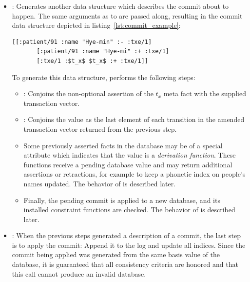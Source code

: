\begin{itemize}
  \item {}: Generates another data structure which describes the commit about to happen. The same arguments as to  are passed along, resulting in the commit data structure depicted in listing~\ref{lst:commit_example}:

  \begin{lstlisting}[label={lst:commit_example},morekeywords={:txe/1},caption=A commit of one retraction and two assertions]
      [[:patient/91 :name "Hye-min" :- :txe/1]
       [:patient/91 :name "Hye-mi" :+ :txe/1]
       [:txe/1 :$t_x$ $t_x$ :+ :txe/1]]
  \end{lstlisting}

  To generate this data structure,  performs the following steps:
  \begin{itemize}
    \item {}: Conjoins the non-optional assertion of the $t_x$ meta fact with the supplied transaction vector.

    \item {}: Conjoins the  value as the last element of each transition in the amended transaction vector returned from the previous step.

    \item {} Some previously asserted facts in the database may be of a special attribute which indicates that the value is a \emph{derivation function}. These functions receive a pending database value and may return additional assertions or retractions, for example to keep a phonetic index on people's names updated. The behavior of  is described later.

    \item {} Finally, the pending commit is applied to a new database, and its installed constraint functions are checked. The behavior of  is described later.
  \end{itemize}

  \item {}: When the previous steps generated a description of a commit, the last step is to apply the commit: Append it to the log and update all indices. Since the commit being applied was generated from the same basis value of the database, it is guaranteed that all consistency criteria are honored and that this call cannot produce an invalid database.
\end{itemize}

